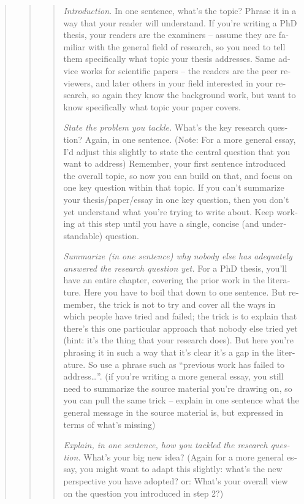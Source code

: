 {{\begin{abstract}
\begin{abstract}
\begin{abstract}
\begin{otherlanguage}{american}
  \emph{Introduction.}
  In one sentence, what’s the topic?
  Phrase it in a way that your reader will understand.
  If you’re writing a PhD thesis, your readers are the examiners – assume they are familiar with the general field of research, so you need to tell them specifically what topic your thesis addresses.
  Same advice works for scientific papers – the readers are the peer reviewers, and later others in your field interested in your research, so again they know the background work, but want to know specifically what topic your paper covers.

  \emph{State the problem you tackle.}
  What’s the key research question?
  Again, in one sentence.
  (Note: For a more general essay, I’d adjust this slightly to state the central question that you want to address)
  Remember, your first sentence introduced the overall topic, so now you can build on that, and focus on one key question within that topic.
  If you can’t summarize your thesis/paper/essay in one key question, then you don’t yet understand what you’re trying to write about.
  Keep working at this step until you have a single, concise (and understandable) question.

  \emph{Summarize (in one sentence) why nobody else has adequately answered the research question yet.}
  For a PhD thesis, you’ll have an entire chapter, covering the prior work in the literature.
  Here you have to boil that down to one sentence.
  But remember, the trick is not to try and cover all the ways in which people have tried and failed; the trick is to explain that there’s this one particular approach that nobody else tried yet (hint: it’s the thing that your research does).
  But here you’re phrasing it in such a way that it’s clear it’s a gap in the literature.
  So use a phrase such as “previous work has failed to address…”.
  (if you’re writing a more general essay, you still need to summarize the source material you’re drawing on, so you can pull the same trick – explain in one sentence what the general message in the source material is, but expressed in terms of what’s missing)

  \emph{Explain, in one sentence, how you tackled the research question.}
  What’s your big new idea?
  (Again for a more general essay, you might want to adapt this slightly: what’s the new perspective you have adopted? or:
  What’s your overall view on the question you introduced in step 2?)


\end{otherlanguage}
\end{abstract}
\end{abstract}
\end{abstract}}}
